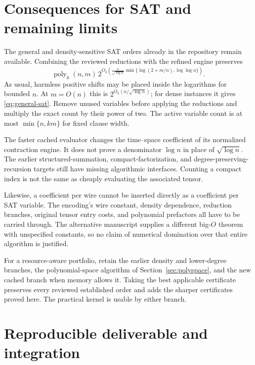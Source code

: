 \documentclass[11pt]{article}
\theoremstyle{definition}\newtheorem{definition}[theorem]{Definition}
\theoremstyle{remark}\newtheorem{remark}[theorem]{Remark}
\newcommand{\poly}{\operatorname{poly}}
\begin{document}
\section{Consequences for SAT and remaining limits}
\label{sec:sat}

The general and density-sensitive SAT orders already in the repository remain
available. Combining the reviewed reductions with the refined engine preserves
\begin{equation}
 \poly_k(n,m)\,
 2^{O_k\!\left(
 \frac n{\sqrt{\log n}}
 \min\{\log(2+m/n),\log\log n\}\right)}.
 \label{eq:density}
\end{equation}
As usual, harmless positive shifts may be placed inside the logarithms for
bounded $n$. At $m=O(n)$ this is $2^{O_k(n/\sqrt{\log n})}$; for dense
instances it gives \eqref{eq:general-sat}. Remove unused variables before
applying the reductions and multiply the exact count by their power of two.
The active variable count is at most $\min\{n,km\}$ for fixed clause width.

The faster cached evaluator changes the time--space coefficient of its
normalized contraction engine. It does not prove a denominator $\log n$ in
place of $\sqrt{\log n}$. The earlier structured-summation, compact-factorization,
and degree-preserving-recursion targets still have missing algorithmic
interfaces. Counting a compact index is not the same as cheaply evaluating
the associated tensor.

Likewise, a coefficient per wire cannot be inserted directly as a coefficient
per SAT variable. The encoding's wire constant, density dependence, reduction
branches, original tensor entry costs, and polynomial prefactors all have to
be carried through. The alternative manuscript supplies a different
big-$O$ theorem with unspecified constants, so no claim of numerical
domination over that entire algorithm is justified.

For a resource-aware portfolio, retain the earlier density and lower-degree
branches, the polynomial-space algorithm of Section~\ref{sec:polyspace}, and
the new cached branch when memory allows it. Taking the best applicable
certificate preserves every reviewed established order and adds the sharper
certificates proved here. The practical kernel is usable by either branch.

\section{Reproducible deliverable and integration}
\label{sec:deliverable}
\end{document}
